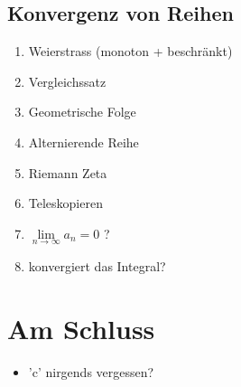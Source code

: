 \subsection*{Konvergenz von Reihen}
\begin{enumerate}
\item Weierstrass (monoton + beschränkt)
\item Vergleichssatz
\item Geometrische Folge
\item Alternierende Reihe
\item Riemann Zeta
\item Teleskopieren
\item $\lim \limits_{n \rightarrow \infty} a_n = 0$ ?
\item konvergiert das Integral?
\end{enumerate}

\section{Am Schluss}
\begin{itemize}
	\item 'c' nirgends vergessen?
\end{itemize}